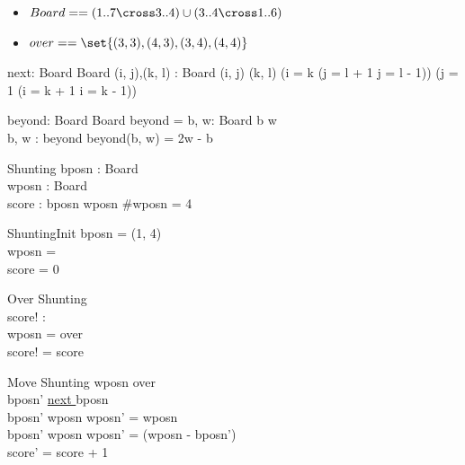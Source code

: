 \documentclass[10pt, landscape]{article}
\begin{document}
\begin{multicols*}{2}
\begin{center}
  \end{center}
  \begin{itemize}
      \item $Board == (1..7 \cross 3..4) \cup (3..4 \cross 1..6)$
      \item $over == \set{(3, 3), (4, 3), (3, 4), (4, 4)}$
  \end{itemize}
  \begin{axdef}
      next: Board \rel Board
      \where
      \forall(i, j),(k, l) : Board \spot (i, j)  (k, l) \iff (i = k \wedge (j = l + 1 \vee j = l - 1)) \vee (j = 1 \wedge (i = k + 1 \vee i = k - 1))    
  \end{axdef}
  \begin{axdef}
      beyond: Board \cross Board \pfun \nat \cross \nat
      \where
      \dom beyond = {b, w: Board \mid b  w}\\
      \forall b, w : \dom beyond \spot beyond(b, w) = 2w - b
  \end{axdef}
  \begin{multicols}{3}
    \begin{schema}{Shunting}
      bposn : Board\\
      wposn : \power Board\\
      score : \nat
      \where
      bposn \not \in wposn \wedge \#wposn = 4
    \end{schema}
    \begin{schema}{ShuntingInit}
      bposn = (1, 4)\\
      wposn = \\
      score = 0
    \end{schema}
    \begin{schema}{Over}
      \Xi Shunting \\
      score! : \nat \\
      \where
      wposn = over \\
      score! = score
    \end{schema}
  \end{multicols}
  \begin{schema}{Move}
    \Delta Shunting
    \where
    wposn \neq over \\
    bposn' \underline{ next } bposn \\
    bposn' \not \in wposn \implies wposn' = wposn \\
    bposn' \in wposn \implies wposn' = (wposn - {bposn'})  \\
    score' = score + 1
  \end{schema}


\end{multicols*}
\end{document}
